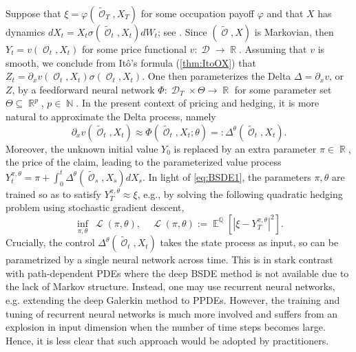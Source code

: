 \documentclass[11pt]{article}
\theoremstyle{plain}
\theoremstyle{definition}
\DeclareMathOperator{\E}{\mathbb{E}}
\DeclareMathOperator{\N}{\mathbb{N}}
\DeclareMathOperator{\Q}{\mathbb{Q}}
\DeclareMathOperator{\R}{\mathbb{R}}
\DeclareMathOperator{\calD}{\mathcal{D}}
\DeclareMathOperator{\calL}{\mathcal{L}}
\DeclareMathOperator{\calO}{\mathcal{O}}
\begin{document}
Suppose that $\xi = \varphi(\tilde{\calO}_T,X_T)$ for some occupation payoff $\varphi$ and that $X$ has dynamics $dX_t =  X_t\sigma(\tilde{\calO}_t,X_t)dW_t$; see \cite{TissotLOV}. 
Since $(\tilde{\calO},X)$ is Markovian, then  $Y_t  = v(\calO_t,X_t)$ for some price functional $v:\calD\to \R$.   %
Assuming that  $v$ is smooth, we conclude from  It\^o's formula (\cref{thm:ItoOX}) that $Z_t = \partial_x v(\calO_t,X_t)  \sigma(\calO_t,X_t)$. One then parameterizes the Delta $\Delta = \partial_x v$, or $Z$, by a feedforward neural network $\Phi:\calD_T \times \Theta \to \R$ for some  parameter set $\Theta \subseteq \R^p$, $p\in \N$. In the present  context of pricing and hedging, it is more natural  to approximate the Delta process, namely
\begin{equation}\label{eq:ZTheta}
    \partial_x v(\tilde{\calO}_t,X_t)   \approx \Phi(\tilde{\calO}_t,X_t; \theta) = :\Delta^{\theta}(\tilde{\calO}_t,X_t).
\end{equation}
Moreover, the unknown initial value $Y_0$ is replaced by an extra parameter $\pi\in \R$, the  price of the claim, leading to the parameterized value process $ Y_t^{\pi, \theta} = \pi + \int_0^t \Delta^{\theta}(\tilde{\calO}_s,X_s)dX_s$. 
In light of \eqref{eq:BSDE1}, the parameters $\pi,\theta$ are trained so as to satisfy $Y_T^{\pi, \theta} \approx \xi$, e.g., by solving the following quadratic hedging problem using stochastic gradient descent,
\begin{equation}\label{eq:loss}
    \inf_{\pi, \theta} \ \calL(\pi,\theta), \quad \calL(\pi, \theta) := \E^{\Q}[|\xi - Y_T^{\pi, \theta}|^2]. 
\end{equation}
Crucially, the control $\Delta^{\theta}(\tilde{\calO}_t,X_t)$ takes the state process as input, so  can be parametrized by a single neural network across time. This is in stark contrast with  path-dependent PDEs where the deep BSDE method is not available due to the lack of Markov structure. Instead, one may use  recurrent neural networks, e.g. \cite{SaporitoPPDE} extending the deep Galerkin method to PPDEs.  However, the training and tuning of recurrent neural networks is much more involved and suffers from an explosion in input dimension when the number of time steps becomes large. Hence,  it is less clear that such approach would be  adopted by practitioners.  
\end{document}
